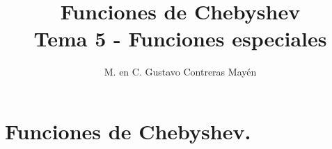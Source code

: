 
\title{Funciones de Chebyshev \\ \large {Tema 5 - Funciones especiales} \vspace{-3ex}}
\author{M. en C. Gustavo Contreras Mayén}
\date{ }

\vspace{-4cm}
\maketitle
\fontsize{14}{14}\selectfont
\tableofcontents
\newpage

\section{Funciones de Chebyshev.}

